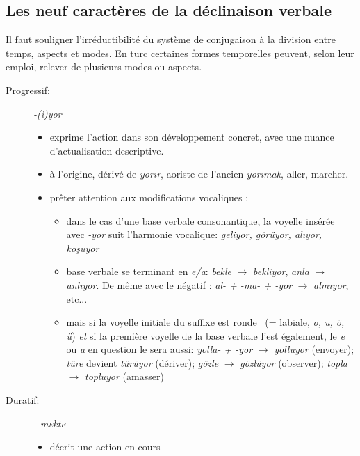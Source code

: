 \documentclass{cours}
\newcommand{\ch}{\c{s}}
\newcommand{\sce}{\textsc{e}}
\begin{document}
\subsection{Les neuf caractères de la déclinaison verbale}
Il faut souligner l'irréductibilité du système de conjugaison à la division entre temps, aspects et modes. En turc certaines formes temporelles peuvent, selon leur emploi, relever de plusieurs modes ou aspects.

\begin{description}
    \item[Progressif:] {\sl -(i)yor}
        \begin{itemize}
            \item exprime l'action dans son développement concret, avec une nuance d'actualisation descriptive.
            \item à l'origine, dérivé de \textsl{yor\i r}, aoriste de l'ancien \textsl{yor\i mak}, \og aller, marcher\fg.
            \item prêter attention aux modifications vocaliques :
                  \begin{itemize}[label = \textbullet]
                      \item dans le cas d'une base verbale consonantique, la voyelle insérée avec \textsl{-yor} suit l'harmonie vocalique: \textsl{geliyor, görüyor, al\i yor, ko\ch uyor}
                      \item base verbale se terminant en \textsl{e/a}: \textsl{bekle} $\to$ \textsl{bekliyor}, \textsl{anla} $\to$ \textsl{anl\i yor}. De même avec le négatif : \textsl{al- + -ma- + -yor} $\to$ \textsl{alm\i yor}, etc...
                      \item mais si la voyelle initiale du suffixe est \og ronde \fg\ (= labiale, \textsl{o, u, ö, ü}) \emph{et} si la première voyelle de la base verbale l'est également, le \textsl{e} ou {\sl a} en question le sera aussi: \textsl{yolla- + -yor} $\to$ \textsl{yolluyor} (envoyer); \textsl{türe} devient \textsl{türüyor} (dériver); \textsl{gözle} $\to$ \textsl{gözlüyor} (observer); \textsl{topla} $\to$ \textsl{topluyor} (amasser)
                  \end{itemize}
        \end{itemize}
    \item [Duratif:] {\sl - m\sce kt\sce}
          \begin{itemize}
              \item décrit une action en cours
          \end{itemize}

\end{description}
\end{document}
